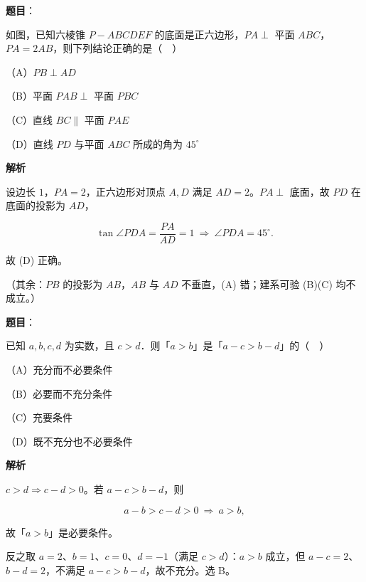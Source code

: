 \begin{answer}

\textbf{题目}：

如图，已知六棱锥 $P-ABCDEF$ 的底面是正六边形，$PA\perp$ 平面 $ABC$，$PA=2AB$，则下列结论正确的是（　）
\nopagebreak[4]
\begin{center}\end{center}
\nopagebreak[4]
（A）$PB\perp AD$

（B）平面 $PAB\perp$ 平面 $PBC$

（C）直线 $BC\parallel$ 平面 $PAE$

（D）直线 $PD$ 与平面 $ABC$ 所成的角为 $45^\circ$

\textbf{解析}

设边长 $1$，$PA=2$，正六边形对顶点 $A,D$ 满足 $AD=2$。$PA\perp$ 底面，故 $PD$ 在底面的投影为 $AD$，

\nopagebreak[4]
\[\tan\angle PDA=\frac{PA}{AD}=1\ \Longrightarrow\ \angle PDA=45^\circ .\]

故 (D) 正确。

（其余：$PB$ 的投影为 $AB$，$AB$ 与 $AD$ 不垂直，(A) 错；建系可验 (B)(C) 均不成立。）


\end{answer}
\begin{answer}

\textbf{题目}：

已知 $a,b,c,d$ 为实数，且 $c>d$．则「$a>b$」是「$a-c>b-d$」的（　）

（A）充分而不必要条件

（B）必要而不充分条件

（C）充要条件

（D）既不充分也不必要条件

\textbf{解析}

$c>d\Rightarrow c-d>0$。若 $a-c>b-d$，则

\nopagebreak[4]
\[a-b>c-d>0\ \Longrightarrow\ a>b,\]

故「$a>b$」是必要条件。

反之取 $a=2$、$b=1$、$c=0$、$d=-1$（满足 $c>d$）：$a>b$ 成立，但 $a-c=2$、$b-d=2$，不满足 $a-c>b-d$，故不充分。选 B。


\end{answer}
